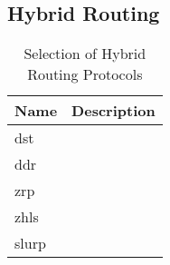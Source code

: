 \subsection{Hybrid Routing}


\begin{table}\centering
  \caption[Selection of Hybrid Routing Protocols]{Selection of Hybrid Routing Protocols}
  \label{tab:hybrid_routing_protocols}
  \begin{tabularx}{\textwidth}{p{1.25cm}|X}\toprule
    Name & Description \\ \midrule
    \gls{dst} & \\
    \gls{ddr} & \\
    \gls{zrp} & \\
    \gls{zhls} & \\
    \gls{slurp} & \\
    
    \bottomrule
  \end{tabularx}
\end{table}


